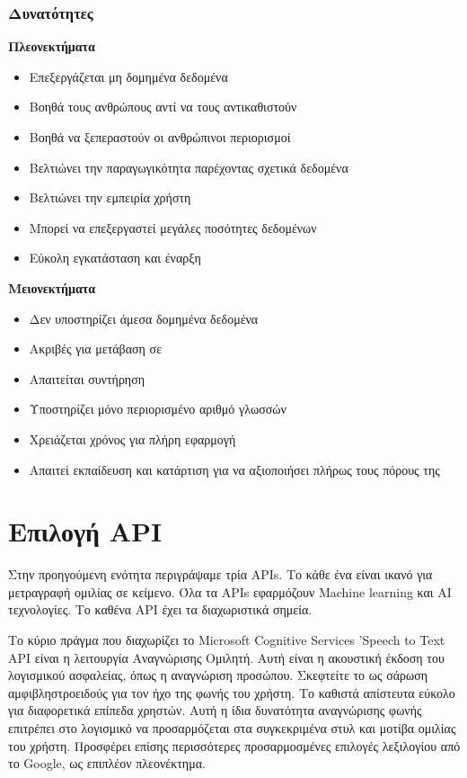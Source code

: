 \documentclass[oneside, 12pt]{book}
\begin{document}
\subsubsection{Δυνατότητες}
\textbf{Πλεονεκτήματα}
\begin{itemize}
  \item Επεξεργάζεται μη δομημένα δεδομένα
  \item Βοηθά τους ανθρώπους αντί να τους αντικαθιστούν
  \item Βοηθά να ξεπεραστούν οι ανθρώπινοι περιορισμοί
  \item Βελτιώνει την παραγωγικότητα παρέχοντας σχετικά δεδομένα
  \item Βελτιώνει την εμπειρία χρήστη
  \item Μπορεί να επεξεργαστεί μεγάλες ποσότητες δεδομένων
  \item Εύκολη εγκατάσταση και έναρξη
\end{itemize}
\textbf{Μειονεκτήματα}
\begin{itemize}
  \item Δεν υποστηρίζει άμεσα δομημένα δεδομένα
  \item Ακριβές για μετάβαση σε
  \item Απαιτείται συντήρηση
  \item Υποστηρίζει μόνο περιορισμένο αριθμό γλωσσών
  \item Χρειάζεται χρόνος για πλήρη εφαρμογή
  \item Απαιτεί εκπαίδευση και κατάρτιση για να αξιοποιήσει πλήρως τους πόρους της
\end{itemize}
\section{Επιλογή API}
\label{sec:επιλογή-api}
Στην προηγούμενη ενότητα περιγράψαμε τρία APIs. Το κάθε ένα είναι ικανό για μετραγραφή ομιλίας σε
κείμενο.
Όλα τα APIs εφαρμόζουν Machine learning και AI τεχνολογίες.
Το καθένα API έχει τα διαχωριστικά σημεία.

Το κύριο πράγμα που διαχωρίζει το Microsoft Cognitive Services ’Speech to Text API είναι η
λειτουργία Αναγνώρισης Ομιλητή.
Αυτή είναι η ακουστική έκδοση του λογισμικού ασφαλείας, όπως η αναγνώριση προσώπου.
Σκεφτείτε το ως σάρωση αμφιβληστροειδούς για τον ήχο της φωνής του χρήστη.
Το καθιστά απίστευτα εύκολο για διαφορετικά επίπεδα χρηστών.
Αυτή η ίδια δυνατότητα αναγνώρισης φωνής επιτρέπει στο λογισμικό να προσαρμόζεται στα συγκεκριμένα
στυλ και μοτίβα ομιλίας του χρήστη.
Προσφέρει επίσης περισσότερες προσαρμοσμένες επιλογές λεξιλογίου από το Google, ως επιπλέον
πλεονέκτημα.
\end{document}
